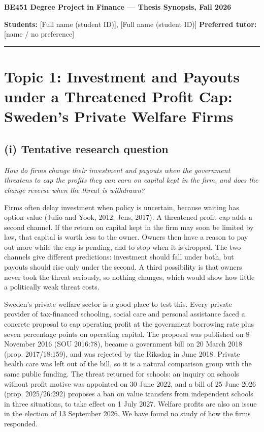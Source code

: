 \documentclass[12pt,a4paper]{article}
\begin{document}
{\large\bfseries BE451 Degree Project in Finance --- Thesis Synopsis, Fall 2026}

\textbf{Students:} [Full name (student ID)], [Full name (student ID)] \hfill \textbf{Preferred tutor:} [name / no preference]

\vspace{2pt}\hrule

\section{Topic 1: Investment and Payouts under a Threatened Profit Cap: Sweden's Private Welfare Firms}

\subsection{(i) Tentative research question}

\emph{How do firms change their investment and payouts when the government threatens to cap the profits they can earn on capital kept in the firm, and does the change reverse when the threat is withdrawn?}

Firms often delay investment when policy is uncertain, because waiting has option value (Julio and Yook, 2012; Jens, 2017). A threatened profit cap adds a second channel. If the return on capital kept in the firm may soon be limited by law, that capital is worth less to the owner. Owners then have a reason to pay out more while the cap is pending, and to stop when it is dropped. The two channels give different predictions: investment should fall under both, but payouts should rise only under the second. A third possibility is that owners never took the threat seriously, so nothing changes, which would show how little a politically weak threat costs.

Sweden's private welfare sector is a good place to test this. Every private provider of tax-financed schooling, social care and personal assistance faced a concrete proposal to cap operating profit at the government borrowing rate plus seven percentage points on operating capital. The proposal was published on 8 November 2016 (SOU 2016:78), became a government bill on 20 March 2018 (prop. 2017/18:159), and was rejected by the Riksdag in June 2018. Private health care was left out of the bill, so it is a natural comparison group with the same public funding. The threat returned for schools: an inquiry on schools without profit motive was appointed on 30 June 2022, and a bill of 25 June 2026 (prop. 2025/26:292) proposes a ban on value transfers from independent schools in three situations, to take effect on 1 July 2027. Welfare profits are also an issue in the election of 13 September 2026. We have found no study of how the firms responded.
\end{document}
